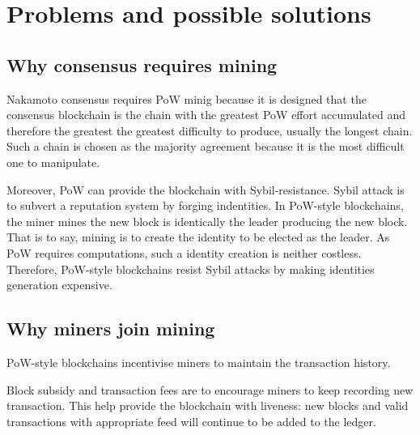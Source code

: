 \section{Problems and possible solutions}









\subsection{Why consensus requires mining}

Nakamoto consensus requires PoW minig because it is designed that the consensus blockchain is the chain with the greatest PoW effort accumulated and therefore the greatest the greatest difficulty to produce, usually the longest chain.
Such a chain is chosen as the majority agreement because it is the most difficult one to manipulate.

Moreover, PoW can provide the blockchain with Sybil-resistance.
Sybil attack is to subvert a reputation system by forging indentities.
In PoW-style blockchains, the miner mines the new block is identically the leader producing the new block.
That is to say, mining is to create the identity to be elected as the leader.
As PoW requires computations, such a identity creation is neither costless.
Therefore, PoW-style blockchains resist Sybil attacks by making identities generation expensive.

\subsection{Why miners join mining}

PoW-style blockchains incentivise miners to maintain the transaction history.

Block subsidy and transaction fees are to encourage miners to keep recording new transaction.
This help provide the blockchain with liveness: new blocks and valid transactions with appropriate feed will continue to be added to the ledger.

